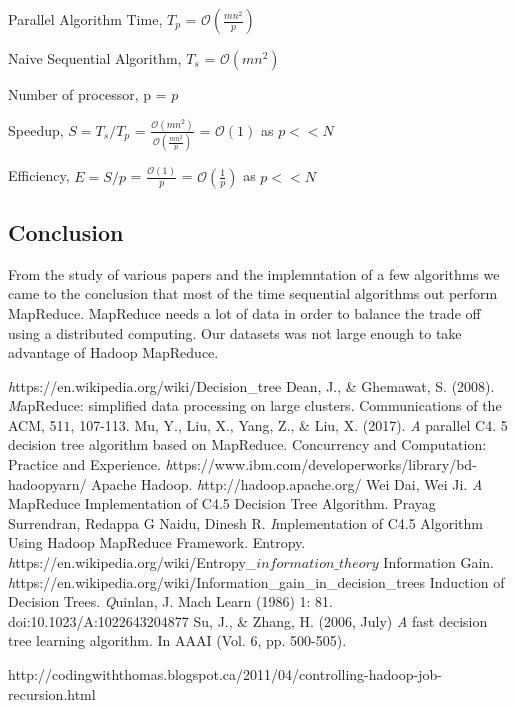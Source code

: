 \documentclass{article}
\begin{document}
\BlankLine Parallel Algorithm Time, ${T_{p}}$ = $\mathcal{O}(\frac{mn^{2}}{p})$

\BlankLine Naive Sequential Algorithm, ${T_{s}}$ = $\mathcal{O}(mn^{2})$

\BlankLine Number of processor, p = $p$

\BlankLine Speedup, ${S = T_{s}/T_{p}}$ = $\frac{\mathcal{O}(mn^{2})}{\mathcal{O}(\frac{mn^{2}}{p})}$ = $\mathcal{O}(1)$ as $p << N$

\BlankLine Efficiency, ${E = S/p}$ = $\frac{\mathcal{O}(1)}{p}$ = $\mathcal{O}(\frac{1}{p})$ as $p << N$

\subsection{Conclusion}
From the study of various papers and the implemntation of a few algorithms we came to the conclusion that most of the time sequential algorithms out perform MapReduce.
MapReduce needs a lot of data in order to balance the trade off using a distributed computing. Our datasets was not large enough to take advantage of Hadoop MapReduce.
\begin{thebibliography}{9}
\textit https://en.wikipedia.org/wiki/Decision\_tree
Dean, J., \& Ghemawat, S. (2008).
\textit MapReduce: simplified data processing on large clusters. Communications of the ACM, 51\(1\), 107-113.
Mu, Y., Liu, X., Yang, Z., \& Liu, X. (2017).
\textit A parallel C4. 5 decision tree algorithm based on MapReduce. Concurrency and Computation: Practice and Experience.
\textit https://www.ibm.com/developerworks/library/bd-hadoopyarn/
Apache Hadoop.
\textit http://hadoop.apache.org/
Wei Dai, Wei Ji.
\textit A MapReduce Implementation of C4.5 Decision Tree Algorithm.
Prayag Surrendran, Redappa G Naidu, Dinesh R.
\textit Implementation of C4.5 Algorithm Using Hadoop MapReduce Framework.
Entropy.
\textit https://en.wikipedia.org/wiki/Entropy\_\(information\_theory\)
Information Gain.
\textit https://en.wikipedia.org/wiki/Information\_gain\_in\_decision\_trees
Induction of Decision Trees.
\textit Quinlan, J. Mach Learn (1986) 1: 81. doi:10.1023/A:1022643204877
 Su, J., \& Zhang, H. (2006, July)
\textit A fast decision tree learning algorithm. In AAAI (Vol. 6, pp. 500-505).
\end{thebibliography}
http://codingwiththomas.blogspot.ca/2011/04/controlling-hadoop-job-recursion.html
\end{document}
